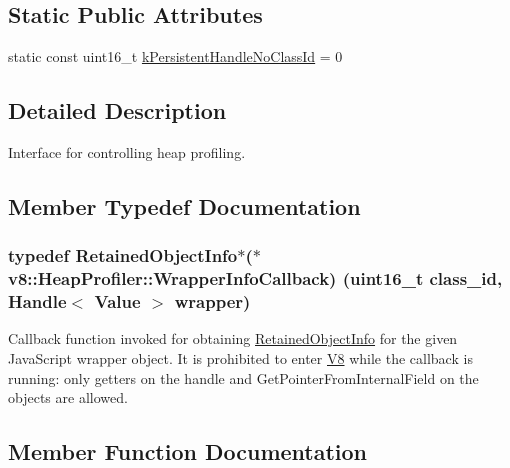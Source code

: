 \subsection*{Static Public Attributes}
\begin{DoxyCompactItemize}
\item 
static const uint16\+\_\+t \hyperlink{classv8_1_1_heap_profiler_a272c9af3ea5cd90a2737af3d22a7eb78}{k\+Persistent\+Handle\+No\+Class\+Id} = 0
\end{DoxyCompactItemize}


\subsection{Detailed Description}
Interface for controlling heap profiling. 

\subsection{Member Typedef Documentation}
\hypertarget{classv8_1_1_heap_profiler_a696d8d6590879eeb5a4ad2814eafb599}{}
\subsubsection[{Wrapper\+Info\+Callback}]{\setlength{\rightskip}{0pt plus 5cm}typedef {\bf Retained\+Object\+Info}$\ast$($\ast$ v8\+::\+Heap\+Profiler\+::\+Wrapper\+Info\+Callback) (uint16\+\_\+t class\+\_\+id, {\bf Handle}$<$ {\bf Value} $>$ wrapper)}\label{classv8_1_1_heap_profiler_a696d8d6590879eeb5a4ad2814eafb599}
Callback function invoked for obtaining \hyperlink{classv8_1_1_retained_object_info}{Retained\+Object\+Info} for the given Java\+Script wrapper object. It is prohibited to enter \hyperlink{classv8_1_1_v8}{V8} while the callback is running\+: only getters on the handle and Get\+Pointer\+From\+Internal\+Field on the objects are allowed. 

\subsection{Member Function Documentation}
\hypertarget{classv8_1_1_heap_profiler_ae83d1fc891a24ecafdca44fca2dbe07a}{}
